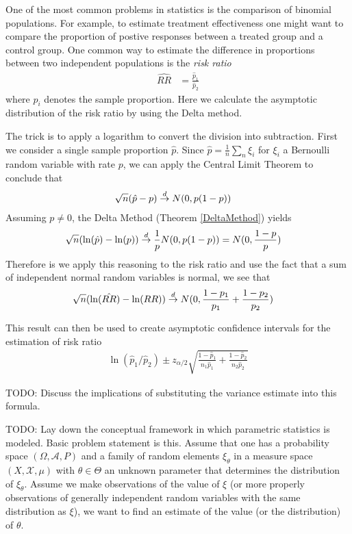 \begin{examp}One of the most common problems in statistics is the
  comparison of binomial populations.  For example, to estimate
  treatment effectiveness one might want to compare the proportion of
  postive responses between a treated group and a control group.  One
  common way to estimate the difference in proportions between two
  independent populations is the \emph{risk ratio}
\begin{align*}
\hat{RR} &= \frac{\hat{p}_1}{\hat{p}_2}
\end{align*}
where $\hat{p}_i$ denotes the sample proportion.  Here we calculate
the asymptotic distribution of the risk ratio by using the Delta method.

The trick is to apply a logarithm to convert the division into
subtraction.  First we consider a single sample proportion $\hat{p}$.  Since
$\hat{p} = \frac{1}{n} \sum_n \xi_i$ for $\xi_i$ a Bernoulli random
variable with rate $p$, we can apply the Central Limit Theorem to
conclude that 
\begin{align*}
\sqrt{n} (\hat{p} - p) &\overset{d}\to N(0, p(1-p))
\end{align*}
Assuming $p \neq 0$, the Delta Method (Theorem \ref{DeltaMethod}) yields
\begin{align*}
\sqrt{n} (\ln (\hat{p}) - \ln(p)) &\overset{d}\to \frac{1}{p}N(0, p(1-p)) =
  N(0, \frac{1-p}{p})
\end{align*}
Therefore is we apply this reasoning to the risk ratio and use the
fact that a sum of independent normal random variables is normal, we
see that 
\begin{align*}
\sqrt{n} (\ln (\hat{RR}) - \ln(RR)) &\overset{d}\to N(0, \frac{1-p_1}{p_1} + \frac{1-p_2}{p_2})
\end{align*}

This result can then be used to create asymptotic confidence intervals
for the estimation of risk ratio 
\begin{align*}
\ln(\hat{p}_1/\hat{p}_2) \pm z_{\alpha/2}\sqrt{\frac{1-\hat{p}_1}{n_1
  \hat{p}_1} + \frac{1-\hat{p}_2}{n_2 \hat{p}_2}}
\end{align*}


TODO: Discuss the implications of substituting the variance estimate
into this formula.
\end{examp}
TODO: Lay down the conceptual framework in which parametric statistics
is modeled.  Basic problem statement is this.  Assume that one has a
probability space $(\Omega, \mathcal{A}, P)$ and a family of random
elements $\xi_\theta$ in a measure space $(X, \mathcal{X}, \mu)$ with
$\theta \in \Theta$ an unknown parameter that determines the
distribution of $\xi_\theta$.   Assume we make observations of the
value of $\xi$ (or more properly observations of generally independent
random variables with the same distribution as $\xi$), we want to find an estimate of the value (or the
distribution) of $\theta$.

